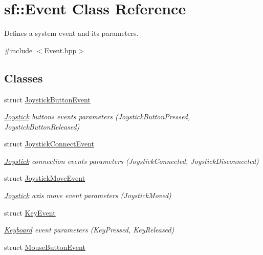 \hypertarget{classsf_1_1_event}{}\section{sf\+:\+:Event Class Reference}
\label{classsf_1_1_event}


Defines a system event and its parameters.  




{\ttfamily \#include $<$Event.\+hpp$>$}

\subsection*{Classes}
\begin{DoxyCompactItemize}
\item 
struct \mbox{\hyperlink{structsf_1_1_event_1_1_joystick_button_event}{Joystick\+Button\+Event}}
\begin{DoxyCompactList}\small\item\em \mbox{\hyperlink{classsf_1_1_joystick}{Joystick}} buttons events parameters (Joystick\+Button\+Pressed, Joystick\+Button\+Released) \end{DoxyCompactList}\item 
struct \mbox{\hyperlink{structsf_1_1_event_1_1_joystick_connect_event}{Joystick\+Connect\+Event}}
\begin{DoxyCompactList}\small\item\em \mbox{\hyperlink{classsf_1_1_joystick}{Joystick}} connection events parameters (Joystick\+Connected, Joystick\+Disconnected) \end{DoxyCompactList}\item 
struct \mbox{\hyperlink{structsf_1_1_event_1_1_joystick_move_event}{Joystick\+Move\+Event}}
\begin{DoxyCompactList}\small\item\em \mbox{\hyperlink{classsf_1_1_joystick}{Joystick}} axis move event parameters (Joystick\+Moved) \end{DoxyCompactList}\item 
struct \mbox{\hyperlink{structsf_1_1_event_1_1_key_event}{Key\+Event}}
\begin{DoxyCompactList}\small\item\em \mbox{\hyperlink{classsf_1_1_keyboard}{Keyboard}} event parameters (Key\+Pressed, Key\+Released) \end{DoxyCompactList}\item 
struct \mbox{\hyperlink{structsf_1_1_event_1_1_mouse_button_event}{Mouse\+Button\+Event}}

\end{DoxyCompactItemize}
